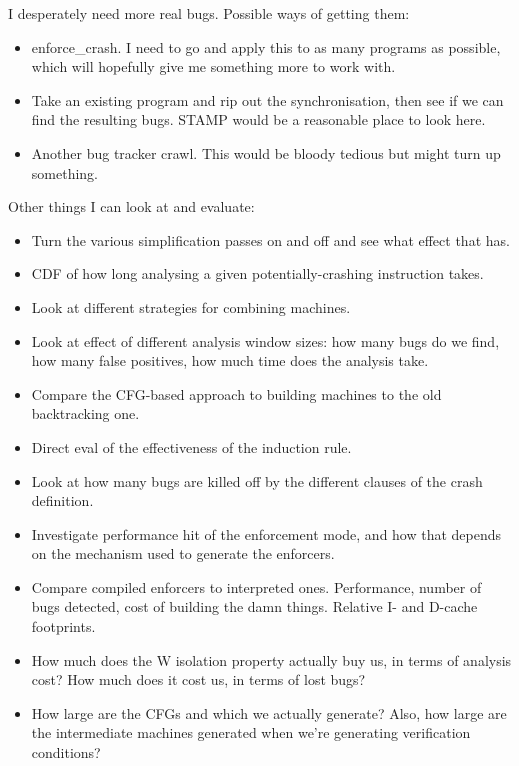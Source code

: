 I desperately need more real bugs.
Possible ways of getting them:

\begin{itemize}
\item
  enforce\_crash.
  I need to go and apply this to as many programs as possible, which will hopefully give me something more to work with.
\item
  Take an existing program and rip out the synchronisation, then see if we can find the resulting bugs.
  STAMP would be a reasonable place to look here.
\item
  Another bug tracker crawl.
  This would be bloody tedious but might turn up something.
\end{itemize}

Other things I can look at and evaluate:

\begin{itemize}
\item
  Turn the various simplification passes on and off and see what effect that has.
\item
  CDF of how long analysing a given potentially-crashing instruction takes.
\item
  Look at different strategies for combining machines.
\item
  Look at effect of different analysis window sizes: how many bugs do we find, how many false positives, how much time does the analysis take.
\item
  Compare the CFG-based approach to building machines to the old backtracking one.
\item
  Direct eval of the effectiveness of the induction rule.
\item
  Look at how many bugs are killed off by the different clauses of the crash definition.
\item
  Investigate performance hit of the enforcement mode, and how that depends on the mechanism used to generate the enforcers.
\item
  Compare compiled enforcers to interpreted ones.
  Performance, number of bugs detected, cost of building the damn things.
  Relative I- and D-cache footprints.
\item
  How much does the W isolation property actually buy us, in terms of analysis cost?
  How much does it cost us, in terms of lost bugs?
\item
  How large are the CFGs and \StateMachines which we actually generate?
  Also, how large are the intermediate machines generated when we're generating verification conditions?

\end{itemize}
